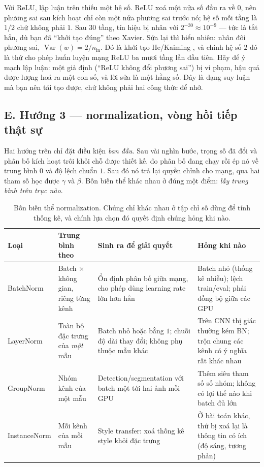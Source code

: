 \documentclass[../../../deep_learning.tex]{subfiles}
\begin{document}
Với ReLU, lập luận trên thiếu một hệ số. ReLU xoá một nửa số đầu ra về \(0\), nên phương sai sau kích hoạt chỉ còn một nửa phương sai trước nó; hệ số mỗi tầng là \(1/2\) chứ không phải \(1\). Sau \(30\) tầng, tín hiệu bị nhân với \(2^{-30} \approx 10^{-9}\) --- tức là tắt hẳn, dù bạn đã ``khởi tạo đúng'' theo Xavier. Sửa lại thì hiển nhiên: nhân đôi phương sai, \(\operatorname{Var}(w) = 2/n_{\text{in}}\). Đó là khởi tạo He/Kaiming \cite{he2015delving}, và chính hệ số \(2\) đó là thứ cho phép huấn luyện mạng ReLU ba mươi tầng lần đầu tiên. Hãy để ý mạch lập luận: một giả định (``ReLU không đổi phương sai'') bị vi phạm, hậu quả được lượng hoá ra một con số, và lời sửa là một hằng số. Đây là dạng suy luận mà bạn nên tái tạo được, chứ không phải hai công thức để nhớ.

\subsection{E. Hướng 3 --- normalization, vòng hồi tiếp thật sự}
Hai hướng trên chỉ đặt điều kiện \emph{ban đầu}. Sau vài nghìn bước, trọng số đã đổi và phân bố kích hoạt trôi khỏi chỗ được thiết kế.  đo phân bố đang chạy rồi ép nó về trung bình \(0\) và độ lệch chuẩn \(1\). Sau đó nó trả lại quyền chỉnh cho mạng, qua hai tham số học được \(\gamma\) và \(\beta\). Bốn biến thể khác nhau ở đúng một điểm: \emph{lấy trung bình trên trục nào}.

\begin{table}[H]\centering\small
\caption{Bốn biến thể normalization. Chúng chỉ khác nhau ở tập chỉ số dùng để tính thống kê, và chính lựa chọn đó quyết định chúng hỏng khi nào.}
\label{tab:norm}
\begin{tabularx}{\linewidth}{@{}L{2.2cm}L{3.0cm}YY@{}}
\toprule
\textbf{Loại} & \textbf{Trung bình theo} & \textbf{Sinh ra để giải quyết} & \textbf{Hỏng khi nào}\\
\midrule
BatchNorm \cite{ioffe2015batchnorm} & Batch \(\times\) không gian, riêng từng kênh & Ổn định phân bố giữa mạng, cho phép dùng learning rate lớn hơn hẳn & Batch nhỏ (thống kê nhiễu); lệch train/eval; phải đồng bộ giữa các GPU\\
LayerNorm \cite{ba2016layernorm} & Toàn bộ đặc trưng của \emph{một} mẫu & Batch nhỏ hoặc bằng \(1\); chuỗi độ dài thay đổi; không phụ thuộc mẫu khác & Trên CNN thị giác thường kém BN; trộn chung các kênh có ý nghĩa rất khác nhau\\
GroupNorm \cite{wu2018groupnorm} & Nhóm kênh của một mẫu & Detection/segmentation với batch một tới hai ảnh mỗi GPU & Thêm siêu tham số số nhóm; không có lợi thế nào khi batch đủ lớn\\
InstanceNorm & Mỗi kênh của mỗi mẫu & Style transfer: xoá thống kê style khỏi đặc trưng & Ở bài toán khác, thứ bị xoá lại là thông tin có ích (độ sáng, tương phản)\\
\bottomrule
\end{tabularx}
\end{table}
\end{document}
